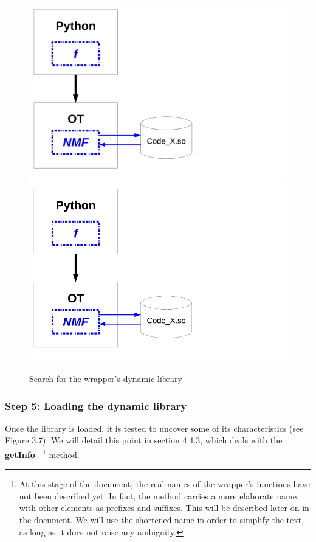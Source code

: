 \begin{figure}
  \begin{center}
    \ifpdf
    \includegraphics[width=12cm]{Figure6.pdf}
    \else
    \includegraphics[width=12cm]{Figure6.png}
    \fi
    \caption[Figure 6]{Search for the wrapper's dynamic library}
  \end{center}
\end{figure}

\subsubsection{Step 5: Loading the dynamic library}

Once the library is loaded, it is tested to uncover some of its characteristics (see Figure 3.7). We will detail this point in section 4.4.3, which deals with the {\bf getInfo\_}\footnote{At this stage of the document, the real names of the wrapper's functions have not been described yet. In fact, the  method carries a more elaborate name, with other elements as prefixes and suffixes. This will be described later on in the document. We will use the shortened name in order to simplify the text, as long as it does not raise any ambiguity.} method.

